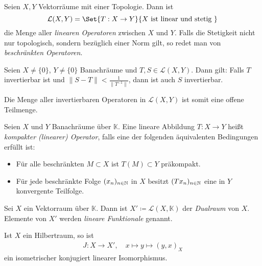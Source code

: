 \documentclass{cheat-sheet}
\newcommand{\K}{\mathbb{K}}
\begin{document}
\begin{defn}
  Seien $X, Y$ Vektorräume mit einer Topologie. Dann ist
  \[ \mathcal{L}(X, Y) = \Set{ T : X \to Y }{ X \text{ ist linear und stetig } } \]
  die Menge aller \emph{linearen Operatoren} zwischen $X$ und $Y$. Falls die Stetigkeit nicht nur topologisch, sondern bezüglich einer Norm gilt, so redet man von \emph{beschränkten Operatoren}.
\end{defn}

\begin{satz}
  Seien $X \not= \{0\}$, $Y \not= \{0\}$ Banachräume und $T, S \in \mathcal{L}(X, Y)$. Dann gilt: Falls $T$ invertierbar ist und $\|S-T\| < \tfrac{1}{\|T^{-1}\|}$, dann ist auch $S$ invertierbar.
\end{satz}

\begin{bem}
  Die Menge aller invertierbaren Operatoren in $\mathcal{L}(X, Y)$ ist somit eine offene Teilmenge.
\end{bem}

\begin{defn}
  Seien $X$ und $Y$ Banachräume über $\K$. Eine lineare Abbildung $T : X \to Y$ heißt \emph{kompakter (linearer) Operator}, falls eine der folgenden äquivalenten Bedingungen erfüllt ist:
  \begin{itemize}
    \item Für alle beschränkten $M \subset X$ ist $T(M) \subset Y$ präkompakt.
    \item Für jede beschränkte Folge $(x_n)_{n \in \mathbb{N}}$ in $X$ besitzt $(T x_n)_{n \in \mathbb{N}}$ eine in $Y$ konvergente Teilfolge.
  \end{itemize}
\end{defn}

\begin{defn}
  Sei $X$ ein Vektorraum über $\K$. Dann ist $X' \coloneqq \mathcal{L}(X, \K)$ der \emph{Dualraum} von $X$. Elemente von $X'$ werden \emph{lineare Funktionale} genannt.
\end{defn}

\begin{satz}
  Ist $X$ ein Hilbertraum, so ist
  \begin{align*}
    J : X \to X', \quad x \mapsto y \mapsto (y, x)_X
  \end{align*}
  ein isometrischer konjugiert linearer Isomorphismus.
\end{satz}
\end{document}
